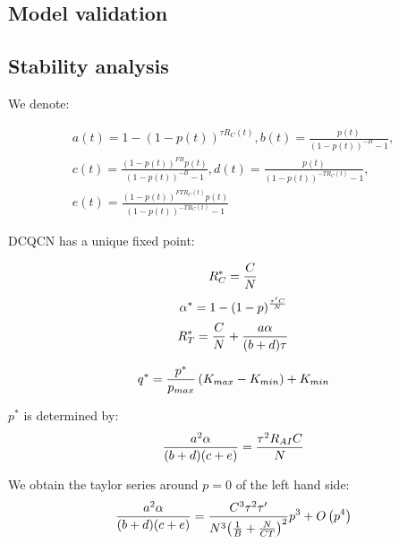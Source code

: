 \subsection{Model validation}

\subsection{Stability analysis}

 We denote:

\begin{equation}
\begin{array}{l}
a(t) = 1 - {(1 - p(t))^{\tau {R_C}(t)}},b(t) = \frac{{p(t)}}{{{{(1 - p(t))}^{ - B}} - 1}},\\
c(t) = \frac{{{{(1 - p(t))}^{FB}}p(t)}}{{{{(1 - p(t))}^{ - B}} - 1}},d(t) = \frac{{p(t)}}{{{{(1 - p(t))}^{ - T{R_C}(t)}} - 1}},\\
e(t) = \frac{{{{(1 - p(t))}^{FT{R_C}(t)}}p(t)}}{{{{(1 - p(t))}^{ - T{R_C}(t)}} - 1}}
\end{array}
\end{equation}

DCQCN has a unique fixed point:

\begin{equation}
\small
{R_C^*} = \frac{C}{N}
\end{equation}
\begin{equation}
\small
\alpha^*  = 1 - {(1 - p)^{\frac{{\tau 'C}}{N}}}
\end{equation}
\begin{equation}
\small
{R_T^*} = \frac{C}{N} + \frac{{a\alpha }}{{(b + d)\tau }}
\end{equation}

\begin{equation}
\small
{q^*} = \frac{{{p^*}}}{{{p_{max}}}}\left( {{K_{max}} - {K_{min}}} \right) + {K_{min}}
\end{equation}

$p^*$ is determined by:
\begin{equation}
\small
\frac{{{a^2}\alpha }}{{(b + d)(c + e)}} = \frac{{{\tau ^2}{R_{AI}}C}}{N}
\end{equation}

We obtain the taylor series around $p=0$ of the left hand side:
\begin{equation}
\small
\frac{{{a^2}\alpha }}{{(b + d)(c + e)}} = \frac{{{C^3}{\tau ^2}\tau '}}{{{N^3}{{\left( {\frac{1}{B} + \frac{N}{{CT}}} \right)}^2}}}{p^3} + O\left( {{p^4}} \right)
\end{equation}

